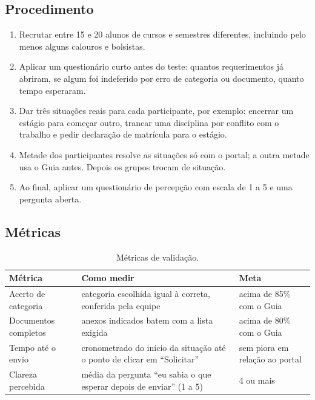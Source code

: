\documentclass[12pt,a4paper]{article}
\begin{document}
\subsection{Procedimento}

\begin{enumerate}
  \item Recrutar entre 15 e 20 alunos de cursos e semestres diferentes, incluindo pelo menos alguns
        calouros e bolsistas.
  \item Aplicar um questionário curto antes do teste: quantos requerimentos já abriram, se algum foi
        indeferido por erro de categoria ou documento, quanto tempo esperaram.
  \item Dar três situações reais para cada participante, por exemplo: encerrar um estágio para começar
        outro, trancar uma disciplina por conflito com o trabalho e pedir declaração de matrícula para
        o estágio.
  \item Metade dos participantes resolve as situações só com o portal; a outra metade usa o Guia antes.
        Depois os grupos trocam de situação.
  \item Ao final, aplicar um questionário de percepção com escala de 1 a 5 e uma pergunta aberta.
\end{enumerate}

\subsection{Métricas}

\begin{table}[H]
\centering
\small
\begin{tabularx}{\textwidth}{@{}lXl@{}}
\toprule
Métrica & Como medir & Meta \\
\midrule
Acerto de categoria & categoria escolhida igual à correta, conferida pela equipe & acima de 85\% com o Guia \\
Documentos completos & anexos indicados batem com a lista exigida & acima de 80\% com o Guia \\
Tempo até o envio & cronometrado do início da situação até o ponto de clicar em ``Solicitar'' & sem piora em relação ao portal \\
Clareza percebida & média da pergunta ``eu sabia o que esperar depois de enviar'' (1 a 5) & 4 ou mais \\
\bottomrule
\end{tabularx}
\caption{Métricas de validação.}
\end{table}
\end{document}

